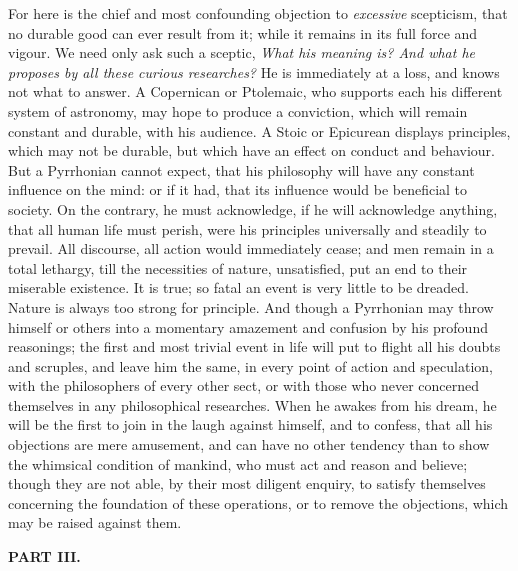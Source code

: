 \documentclass[]{article}
\newcommand*{\itemsubsection}[1]{\begin{center}\addcontentsline{toc}{subsection}{#1}\textbf{#1}\end{center}}
\begin{document}
\begin{sectionbody}
\humeparagraph  For here is the chief and most confounding objection to \emph{excessive} scepticism, that no durable good can ever result from it; while it remains in its full force and vigour. We need only ask such a sceptic, \emph{What his meaning is? And what he proposes by all these curious researches?} He is immediately at a loss, and knows not what to answer. A Copernican or Ptolemaic, who supports each his different system of astronomy, may hope to produce a conviction, which will remain constant and durable, with his audience. A Stoic or Epicurean displays principles, which may not be durable, but which have an effect on conduct and behaviour. But a Pyrrhonian cannot expect, that his philosophy will have any constant influence on the mind: or if it had, that its influence would be beneficial to society. On the contrary, he must acknowledge, if he will acknowledge anything, that all human life must perish, were his principles universally and steadily to prevail. All discourse, all action would immediately cease; and men remain in a total lethargy, till the necessities of nature, unsatisfied, put an end to their miserable existence. It is true; so fatal an event is very little to be dreaded. Nature is always too strong for principle. And though a Pyrrhonian may throw himself or others into a momentary amazement and confusion by his profound reasonings; the first and most trivial event in life will put to flight all his doubts and scruples, and leave him the same, in every point of action and speculation, with the philosophers of every other sect, or with those who never concerned themselves in any philosophical researches. When he awakes from his dream, he will be the first to join in the laugh against himself, and to confess, that all his objections are mere amusement, and can have no other tendency than to show the whimsical condition of mankind, who must act and reason and believe; though they are not able, by their most diligent enquiry, to satisfy themselves concerning the foundation of these operations, or to remove the objections, which may be raised against them.

\end{sectionbody}

\itemsubsection{PART III.}
\end{document}

